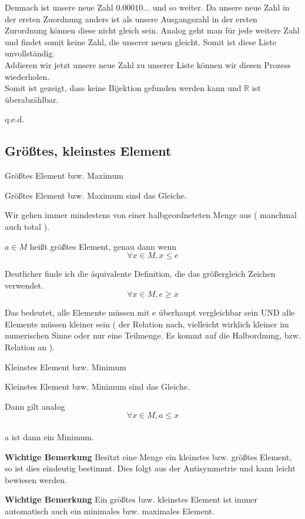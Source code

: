 \documentclass[headsepline,12pt,a4paper]{scrartcl}
\begin{document}
\newpage


Demnach ist unsere neue Zahl $ 0.00010... $ und so weiter. Da unsere neue Zahl in der ersten Zuordnung anders ist als unsere Ausgangszahl in der ersten Zurordnung können diese nicht gleich sein. Analog geht man für jede weitere Zahl und findet somit keine Zahl, die unserer neuen gleicht. Somit ist diese Liste unvollständig. \\
Addieren wir jetzt unsere neue Zahl zu unserer Liste können wir diesen Prozess wiederholen. \\
Somit ist gezeigt, dass keine Bijektion gefunden werden kann und $ \mathbb{R} $ ist überabzählbar. 
\begin{flushright}
q.e.d.
\end{flushright}

\subsection*{Größtes, kleinstes Element}

\begin{center}
\item[Größtes Element bzw. Maximum]
\end{center}
\item Größtes Element bzw. Maximum sind das Gleiche.
\item Wir gehen immer mindestens von einer halbgeordneteten Menge aus ( manchmal auch total ).
\item $ a\in M$ heißt größtes Element, genau dann wenn $$ \forall x \in M , x \leq e $$
\item Deutlicher finde ich die äquivalente Definition, die das größergleich Zeichen verwendet.
$$ \forall x \in M, e \geq x $$
\item Das bedeutet, alle Elemente müssen mit e überhaupt vergleichbar sein UND alle Elemente müssen kleiner sein ( der Relation nach, vielleicht wirklich kleiner im numerischen Sinne oder nur eine Teilmenge. Es kommt auf die Halbordnung, bzw. Relation an ).


\newpage

\begin{center}
\item[Kleinstes Element bzw. Minimum]
\end{center}
\item Kleinstes Element bzw. Minimum sind das Gleiche.
\item Dann gilt analog $$ \forall x \in M, a \leq x $$ \\
 a ist dann ein Minimum.
\item \textbf{Wichtige Bemerkung} Besitzt eine Menge ein kleinstes bzw. größtes Element, so ist dies eindeutig bestimmt. Dies folgt aus der Antisymmetrie und kann leicht bewiesen werden.
\item \textbf{Wichtige Bemerkung} Ein größtes bzw. kleinstes Element ist immer automatisch auch ein minimales bzw. maximales Element.
\end{document}
